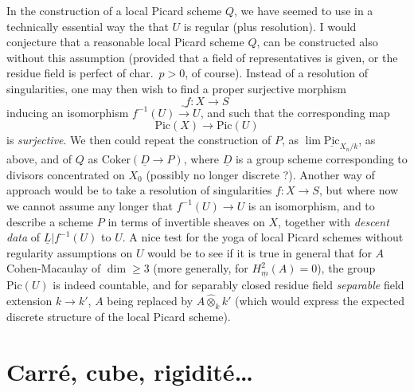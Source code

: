 \documentclass[11pt,a4paper]{article}
\begin{document}
In the construction of a local Picard scheme $Q$, we have seemed to use in a
technically essential way the   that $U$ is
regular (plus resolution). I would conjecture that a reasonable local Picard
scheme $Q$,  can be constructed
also without this assumption (provided that a field of representatives is
given, or the residue field is perfect of char.~$p > 0$, of course). Instead
of a resolution of singularities, one may then wish to find a proper
surjective morphism
\[ f \colon X \longrightarrow S \]
inducing an isomorphism $f^{-1}(U) \xrightarrow{\ \sim\ } U$, and such that
the corresponding map
\[ \mathrm{Pic}(X) \longrightarrow \mathrm{Pic}(U) \]
is \emph{surjective}. We then could repeat the construction of $P$, as
$\lim \underline{\mathrm{Pic}}_{X_n/k}$, as above, and of $Q$ as
$\mathrm{Coker}(\underline{D} \to P)$, where $\underline{D}$ is a group
scheme corresponding to divisors concentrated on $X_0$ (possibly no longer
discrete ?). Another way of approach would be to take a resolution of
singularities $f \colon X \to S$, but where now we cannot assume any longer
that $f^{-1}(U) \to U$ is an isomorphism, and to describe a scheme $P$ in
terms of invertible sheaves on $X$, together with \emph{descent data} of
$\underline{L}|f^{-1}(U)$ to $U$. A nice test for the yoga of local Picard
schemes without regularity assumptions on $U$ would be to see if it is true
in general that for $A$ Cohen-Macaulay of $\dim \geq 3$ (more generally, for
$H^2_{\underline{m}}(A) = 0$), the group $\mathrm{Pic}(U)$ is indeed
countable, and for separably closed residue field \struck{\ill{}}
 \emph{separable} field extension $k \to k'$, $A$
being replaced by $A \hat{\otimes}_k k'$ (which would express the expected
discrete structure of the local Picard scheme).

\section{Carré, cube, rigidité…}
\end{document}
